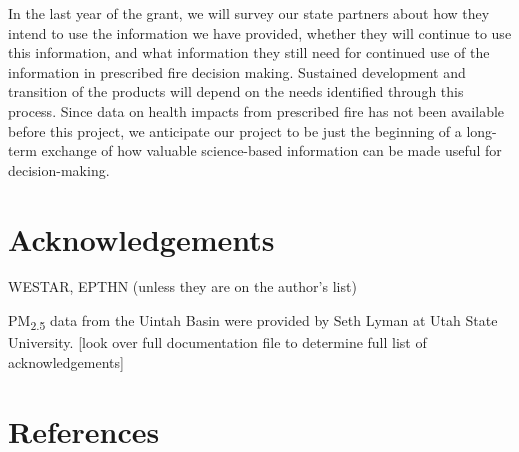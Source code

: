 \documentclass[authoryear]{elsarticle}
\begin{document}
In the last year of the grant, we will survey our state partners about how they intend to use the information we have provided, whether they will continue to use this information, and what information they still need for continued use of the information in prescribed fire decision making. Sustained development and transition of the products will depend on the needs identified through this process. Since data on health impacts from prescribed fire has not been available before this project, we anticipate our project to be just the beginning of a long-term exchange of how valuable science-based information can be made useful for decision-making. 

\section{Acknowledgements}

WESTAR, EPTHN (unless they are on the author's list)

PM\textsubscript{2.5} data from the Uintah Basin were provided by Seth Lyman at Utah State University. [look over full documentation file to determine full list of acknowledgements]




\section*{References}

%



\end{document}
